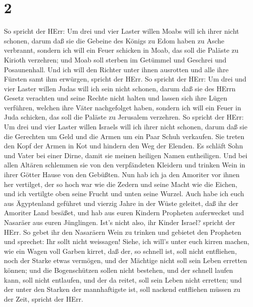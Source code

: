 \hypertarget{section-1}{%
\section{2}\label{section-1}}

 So spricht der HErr: Um drei und vier Laster willen Moabs
will ich ihrer nicht schonen, darum daß sie die Gebeine des Königs zu
Edom haben zu Asche verbrannt,  sondern ich will ein Feuer
schicken in Moab, das soll die Paläste zu Kirioth verzehren; und Moab
soll sterben im Getümmel und Geschrei und Posaunenhall.  Und
ich will den Richter unter ihnen ausrotten und alle ihre Fürsten samt
ihm erwürgen, spricht der HErr.  So spricht der HErr: Um
drei und vier Laster willen Judas will ich sein nicht schonen, darum daß
sie des HErrn Gesetz verachten und seine Rechte nicht halten und lassen
sich ihre Lügen verführen, welchen ihre Väter nachgefolget haben,
 sondern ich will ein Feuer in Juda schicken, das soll die
Paläste zu Jerusalem verzehren.  So spricht der HErr: Um
drei und vier Laster willen Israels will ich ihrer nicht schonen, darum
daß sie die Gerechten um Geld und die Armen um ein Paar Schuh verkaufen.
 Sie treten den Kopf der Armen in Kot und hindern den Weg
der Elenden. Es schläft Sohn und Vater bei einer Dirne, damit sie meinen
heiligen Namen entheiligen.  Und bei allen Altären schlemmen
sie von den verpfändeten Kleidern und trinken Wein in ihrer Götter Hause
von den Gebüßten.  Nun hab ich ja den Amoriter vor ihnen her
vertilget, der so hoch war wie die Zedern und seine Macht wie die
Eichen, und ich vertilgte oben seine Frucht und unten seine Wurzel.
 Auch habe ich euch aus Ägyptenland geführet und vierzig
Jahre in der Wüste geleitet, daß ihr der Amoriter Land besäßet,
 und hab aus euren Kindern Propheten auferwecket und
Nasaräer aus euren Jünglingen. Ist's nicht also, ihr Kinder Israel?
spricht der HErr.  So gebet ihr den Nasaräern Wein zu
trinken und gebietet den Propheten und sprechet: Ihr sollt nicht
weissagen!  Siehe, ich will's unter euch kirren machen, wie
ein Wagen voll Garben kirret,  daß der, so schnell ist,
soll nicht entfliehen, noch der Starke etwas vermögen, und der Mächtige
nicht soll sein Leben erretten können;  und die
Bogenschützen sollen nicht bestehen, und der schnell laufen kann, soll
nicht entlaufen, und der da reitet, soll sein Leben nicht erretten;
 und der unter den Starken der mannhaftigste ist, soll
nackend entfliehen müssen zu der Zeit, spricht der HErr.

